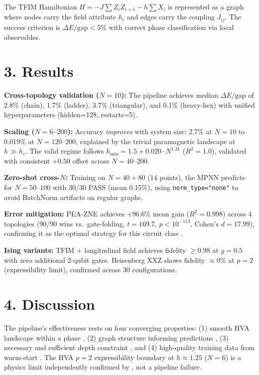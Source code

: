 \documentclass[11pt,a4paper,spanish]{book}
\begin{document}
The TFIM Hamiltonian $H = -J\sum Z_iZ_{i+1} - h\sum X_i$ is represented as a graph where nodes carry the field attribute $h_i$ and edges carry the coupling $J_{ij}$. The success criterion is $\Delta E/\text{gap} < 5\%$ with correct phase classification via local observables.

\section*{3. Results}

\textbf{Cross-topology validation ($N = 10$):} The pipeline achieves median $\Delta E/\text{gap}$ of 2.8\% (chain), 1.7\% (ladder), 3.7\% (triangular), and 0.1\% (heavy-hex) with unified hyperparameters (hidden=128, restarts=5).

\textbf{Scaling ($N = 6$--$200$):} Accuracy \emph{improves} with system size: 2.7\% at $N = 10$ to 0.019\% at $N = 120$--$200$, explained by the trivial paramagnetic landscape at $h \gg h_c$. The valid regime follows $h_{\min} = 1.5 + 0.020 \cdot N^{1.31}$ ($R^2 = 1.0$), validated with consistent $+0.50$ offset across $N = 40$--$200$.

\textbf{Zero-shot cross-$N$:} Training on $N = 40 + 80$ (14 points), the MPNN predicts for $N = 50$--$100$ with 30/30 PASS (mean 0.15\%), using \texttt{norm\_type="none"} to avoid BatchNorm artifacts on regular graphs.

\textbf{Error mitigation:} PEA-ZNE achieves +96.6\% mean gain ($R^2 = 0.998$) across 4 topologies (90/90 wins vs.\ gate-folding, $t = 169.7$, $p < 10^{-113}$, Cohen's $d = 17.99$), confirming it as the optimal strategy for this circuit class \citep{kim2023}.

\textbf{Ising variants:} TFIM + longitudinal field achieves fidelity $\geq 0.98$ at $g = 0.5$ with zero additional 2-qubit gates. Heisenberg XXZ shows fidelity $\approx 0\%$ at $p = 2$ (expressibility limit), confirmed across 30 configurations.

\section*{4. Discussion}

The pipeline's effectiveness rests on four converging properties: (1) smooth HVA landscape within a phase \citep{mele2022}, (2) graph structure informing predictions \citep{slavin2025}, (3) necessary and sufficient depth constraint \citep{mele2026}, and (4) high-quality training data from warm-start \citep{puig2025}. The HVA $p = 2$ expressibility boundary at $h \approx 1.25$ ($N = 6$) is a physics limit independently confirmed by \citet{tripathi2026}, not a pipeline failure.
\end{document}
